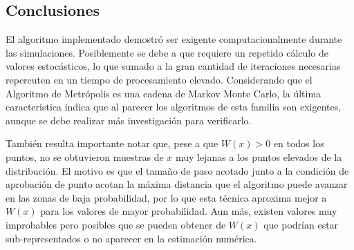 \documentclass{article}
\begin{document}
\subsection{Conclusiones}

El algoritmo implementado demostró ser exigente computacionalmente durante las simulaciones. Posiblemente se debe a que requiere un repetido cálculo de valores estocásticos, lo que sumado a la gran cantidad de iteraciones necesarias repercuten en un tiempo de procesamiento elevado. Considerando que el Algoritmo de Metrópolis es una cadena de Markov Monte Carlo, la última característica indica que al parecer los algoritmos de esta familia son exigentes, aunque se debe realizar más investigación para verificarlo. 

También resulta importante notar que, pese a que $W(x) > 0$ en todos los puntos, no se obtuvieron muestras de $x$ muy lejanas a los puntos elevados de la distribución. El motivo es que el tamaño de paso acotado junto a la condición de aprobación de punto acotan la máxima distancia que el algoritmo puede avanzar en las zonas de baja probabilidad, por lo que esta técnica aproxima mejor a $W(x)$ para los valores de mayor probabilidad. Aun más, existen valores muy improbables pero posibles que se pueden obtener de $W(x)$ que podrían estar sub-representados o no aparecer en la estimación numérica.
\end{document}
